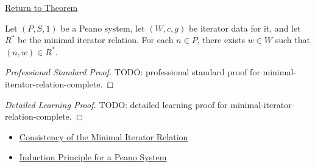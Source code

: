 \newpage
{}
\label{prf:minimal-iterator-relation-complete}

\begin{remark*}[Return]
\hyperref[lem:minimal-iterator-relation-complete]{Return to Theorem}
\end{remark*}

\begin{lemma*}
Let $(P,S,1)$ be a Peano system, let $(W,c,g)$ be iterator data for it, and let
$R^*$ be the minimal iterator relation. For each $n\in P$, there exists
$w\in W$ such that $(n,w)\in R^*$.
\end{lemma*}

\begin{proof}[Professional Standard Proof]
\LRAProofBodyStart
TODO: professional standard proof for minimal-iterator-relation-complete.
\end{proof}

\begin{proof}[Detailed Learning Proof]
\LRAProofBodyStart
TODO: detailed learning proof for minimal-iterator-relation-complete.
\end{proof}

\begin{remark*}
\end{remark*}

\begin{dependencies}
\begin{itemize}
  \item \hyperref[lem:iterator-relation-consistency]{Consistency of the Minimal Iterator Relation}
  \item \hyperref[thm:induction-principle-for-peano-system]{Induction Principle for a Peano System}
\end{itemize}
\end{dependencies}

\clearpage
